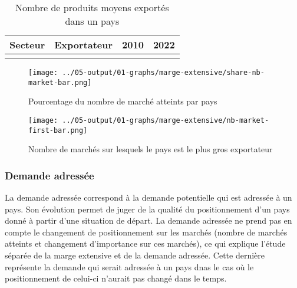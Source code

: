 \documentclass[french,10pt,a4paper]{article}
\begin{document}
\begin{table}[ht]
  \centering
  \begin{tabular}{lrrr}
    \hline
   Secteur & Exportateur & 2010 & 2022 \\
    \hline
    \\
    \hline
  \end{tabular}
  \caption{Nombre de produits moyens exportés dans un pays}
  \label{tab:table-nb-mean-product-export}
\end{table}

\begin{figure}[!h]
  \centering
  \texttt{[image: ../05-output/01-graphs/marge-extensive/share-nb-market-bar.png]}
  \caption{Pourcentage du nombre de marché atteints par pays}
  \label{fig:nb-market-bar}
\end{figure}

\begin{figure}[!h]
  \centering  \texttt{[image: ../05-output/01-graphs/marge-extensive/nb-market-first-bar.png]}
  \caption{Nombre de marchés sur lesquels le pays est le plus gros exportateur}
  \label{fig:nb-market-first-bar}
\end{figure}


\subsubsection{Demande adressée}
La demande adressée correspond à la demande potentielle qui est adressée à un pays. Son évolution permet de juger de la qualité du positionnement d'un pays donné à partir d'une situation de départ. La demande adressée ne prend pas en compte le changement de positionnement sur les marchés (nombre de marchés atteints et changement d'importance sur ces marchés), ce qui explique l'étude séparée de la marge extensive et de la demande adressée. Cette dernière représente la demande qui serait adressée à un pays dnas le cas où le positionnement de celui-ci n'aurait pas changé dans le temps. 
\end{document}
